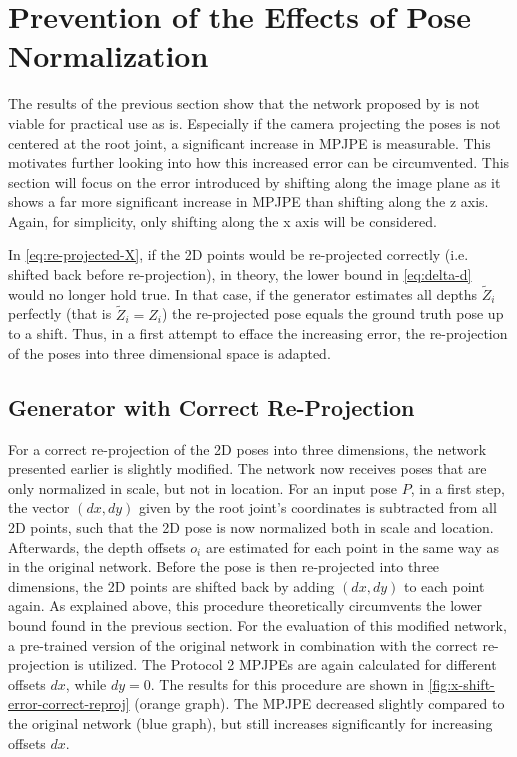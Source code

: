 \section{Prevention of the Effects of Pose Normalization}
\label{sec:network-adjusting}

The results of the previous section show that the network proposed by \citet{drover18} is not viable for practical use as is.
Especially if the camera projecting the poses is not centered at the root joint, a significant increase in MPJPE is measurable.
This motivates further looking into how this increased error can be circumvented.
This section will focus on the error introduced by shifting along the image plane as it shows a far more significant increase in MPJPE than shifting along the z axis.
Again, for simplicity, only shifting along the x axis will be considered.

In \autoref{eq:re-projected-X}, if the 2D points would be re-projected correctly (i.e. shifted back before re-projection), in theory, the lower bound in \autoref{eq:delta-d} would no longer hold true.
In that case, if the generator estimates all depths $\widetilde{Z}_i$ perfectly (that is $\widetilde{Z}_i = Z_i$) the re-projected pose equals the ground truth pose up to a shift.
Thus, in a first attempt to efface the increasing error, the re-projection of the poses into three dimensional space is adapted.

\subsection{Generator with Correct Re-Projection}

For a correct re-projection of the 2D poses into three dimensions, the network presented earlier is slightly modified.
The network now receives poses that are only normalized in scale, but not in location.
For an input pose $P$, in a first step, the vector $(dx, dy)$ given by the root joint's coordinates is subtracted from all 2D points, such that the 2D pose is now normalized both in scale and location.
Afterwards, the depth offsets $o_i$ are estimated for each point in the same way as in the original network.
Before the pose is then re-projected into three dimensions, the 2D points are shifted back by adding $(dx, dy)$ to each point again.
As explained above, this procedure theoretically circumvents the lower bound found in the previous section.
For the evaluation of this modified network, a pre-trained version of the original network in combination with the correct re-projection is utilized.
The Protocol 2 MPJPEs are again calculated for different offsets $dx$, while $dy = 0$.
The results for this procedure are shown in \autoref{fig:x-shift-error-correct-reproj} (orange graph).
The MPJPE decreased slightly compared to the original network (blue graph), but still increases significantly for increasing offsets $dx$.

